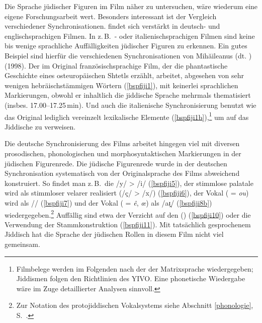 Die Sprache jüdischer Figuren im Film näher zu untersuchen, wäre wiederum eine eigene Forschungsarbeit wert. Besonders interessant ist der Vergleich verschiedener Synchronisationen. \hai{{\FiJi}} findet sich verstärkt in deutsch- und englischsprachigen Filmen. In z.\,B.\, - oder italienischsprachigen Filmen sind keine bis wenige sprachliche Auffälligkeiten jüdischer Figuren zu erkennen. Ein gutes Beispiel sind hierfür die verschiedenen Synchronisationen von Mihăileanus  (dt. ) (1998). Der im Original französischsprachige Film, der die phantastische Geschichte eines osteuropäischen Shtetls erzählt, arbeitet, abgesehen von sehr wenigen hebräischstämmigen Wörtern (\ref{bspfiji1}), mit keinerlei sprachlichen Markierungen, obwohl er inhaltlich die jiddische Sprache mehrmals thematisiert (insbes. 17.00–17.25\,min). Und auch die italienische Synchronisierung benutzt wie das Original lediglich vereinzelt lexikalische Elemente (\ref{bspfiji1b}),\footnote{Filmbelege werden im Folgenden nach der  der Matrixsprache wiedergegeben; Jiddismen folgen den Richtlinien des YIVO. Eine phonetische Wiedergabe wäre im Zuge detaillierter Analysen sinnvoll.} um auf das Jiddische zu verweisen.


\noindent Die deutsche Synchronisierung des Films arbeitet hingegen viel mit diversen prosodischen, phonologischen und morphosyntaktischen Markierungen in der jüdischen Figurenrede. Die jüdische Figurenrede wurde in der deutschen Synchronisation systematisch von der Originalsprache des Films abweichend konstruiert. So findet man z.\,B.\, die  /y/ > /i/ (\ref{bspfiji5}), der stimmlose palatale  wird als stimmloser velarer  realisiert (/ç/ > /x/) (\ref{bspfiji6}), der Vokal  ( = {\mhd} \textit{ou}) wird als /\textopeno \textsubarch{\textsci}/ (\ref{bspfiji7}) und der Vokal  ( = {\mhd} \textit{ê}, \textit{œ}) als /aɪ̯/ (\ref{bspfiji8b}) wiedergegeben.\footnote{Zur Notation des protojiddischen Vokalsystems siehe Abschnitt \ref{phonologie}, S.\, \pageref{phonologie}.} %
Auffällig sind etwa der Verzicht auf den  () (\ref{bspfiji10}) oder die Verwendung der Stammkonstruktion (\ref{bspfiji11}). %
Mit tatsächlich gesprochenem Jiddisch hat die Sprache der jüdischen Rollen in diesem Film nicht viel gemeinsam. 

